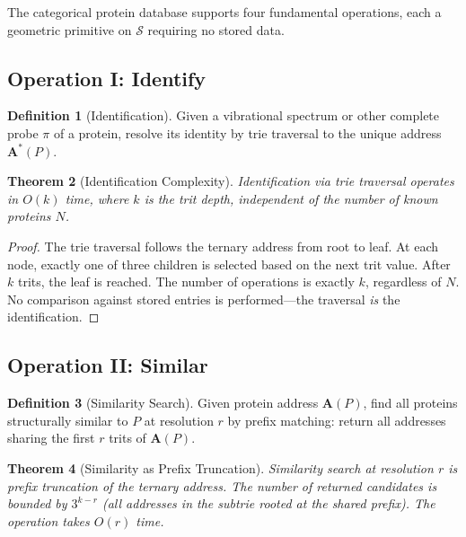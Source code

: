\documentclass[11pt,twocolumn,a4paper]{article}
\newtheorem{theorem}{Theorem}[section]
\theoremstyle{definition}
\newtheorem{definition}[theorem]{Definition}
\theoremstyle{remark}
\newcommand{\Sspace}{\mathcal{S}}
\begin{document}
The categorical protein database supports four fundamental operations, each a geometric primitive on $\Sspace$ requiring no stored data.

\subsection{Operation I: Identify}

\begin{definition}[Identification]
\label{def:identify}
Given a vibrational spectrum or other complete probe $\pi$ of a protein, resolve its identity by trie traversal to the unique address $\mathbf{A}^*(P)$.
\end{definition}

\begin{theorem}[Identification Complexity]
\label{thm:identify}
Identification via trie traversal operates in $O(k)$ time, where $k$ is the trit depth, independent of the number of known proteins $N$.
\end{theorem}

\begin{proof}
The trie traversal follows the ternary address from root to leaf. At each node, exactly one of three children is selected based on the next trit value. After $k$ trits, the leaf is reached. The number of operations is exactly $k$, regardless of $N$. No comparison against stored entries is performed---the traversal \emph{is} the identification.
\end{proof}

\subsection{Operation II: Similar}

\begin{definition}[Similarity Search]
\label{def:similar}
Given protein address $\mathbf{A}(P)$, find all proteins structurally similar to $P$ at resolution $r$ by prefix matching: return all addresses sharing the first $r$ trits of $\mathbf{A}(P)$.
\end{definition}

\begin{theorem}[Similarity as Prefix Truncation]
\label{thm:similar}
Similarity search at resolution $r$ is prefix truncation of the ternary address. The number of returned candidates is bounded by $3^{k-r}$ (all addresses in the subtrie rooted at the shared prefix). The operation takes $O(r)$ time.
\end{theorem}
\end{document}
